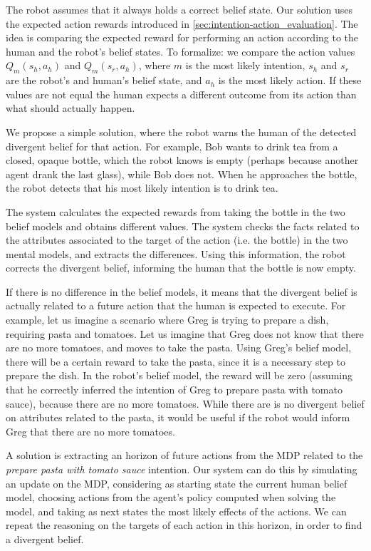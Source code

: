  The robot assumes that it always holds a correct belief state. Our solution uses the expected action rewards introduced in \ref{sec:intention-action_evaluation}. The idea is comparing the expected reward for performing an action according to the human and the robot's belief states. To formalize: we compare the action values \(Q_m(s_h,a_h)\) and \(Q_m(s_r,a_h)\), where $m$ is the most likely intention,  $s_h$ and $s_r$ are the robot's and human's belief state, and $a_h$ is the most likely action. If these values are not equal the human expects a different outcome from its action than what should actually happen. 

We propose a simple solution, where the robot warns the human of the detected divergent belief for that action. For example, Bob wants to drink tea from a closed, opaque bottle, which the robot knows is empty (perhaps because another agent drank the last glass), while Bob does not. When he approaches the bottle, the robot detects that his most likely intention is to drink tea. 

The system calculates the expected rewards from taking the bottle in the two belief models and obtains different values. The system checks the facts related to the attributes associated to the target of the action (i.e. the bottle) in the two mental models, and extracts the differences.  Using this information, the robot corrects the divergent belief, informing the human that the bottle is now empty. 

If there is no difference in the belief models, it means that the divergent belief is actually related to a future action that the human is expected to execute. For example, let us imagine a scenario where Greg is trying to prepare a dish, requiring pasta and tomatoes. Let us imagine that Greg does not know that there are no more tomatoes, and moves to take the pasta. Using Greg's belief model, there will be a certain reward to take the pasta, since it is a necessary step to prepare the dish. In the robot's belief model, the reward will be zero (assuming that he correctly inferred the intention of Greg to prepare pasta with tomato sauce), because there are no more tomatoes. While there are is no divergent belief on attributes related to the pasta, it would be useful if the robot would inform Greg that there are no more tomatoes.

A solution is extracting an horizon of future actions from the MDP related to the \textit{prepare pasta with tomato sauce} intention. Our system can do this by simulating an update on the MDP, considering as starting state the current human belief model, choosing actions from the agent's policy computed when solving the model, and taking as next states the most likely effects of the actions. We can repeat the reasoning on the targets of each action in this horizon, in order to find a divergent belief. 

